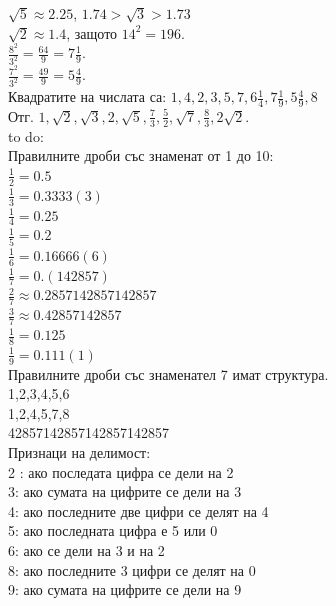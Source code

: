 \documentclass{article}
\begin{document}
$\sqrt{5} \approx 2.25$, $ 1.74 >\sqrt 3 > 1.73 $ \\
$\sqrt 2 \approx 1.4 $, защото $14^2 = 196 $. \\
$\frac{8^2}{3^2} = \frac{64}{9} = 7 \frac{1}{9} $. \\
$\frac{7^2}{3^2} = \frac{49}{9} = 5 \frac{4}{9} $. \\
Квадратите на числата са:
$1,4,2,3,5,7, 6\frac{1}{4}, 7 \frac{1}{9}, 5 \frac{4}{9},8  $ \\
Отг. 
$1, \sqrt 2, \sqrt 3, 2, \sqrt 5, \frac{7}{3}, \frac{5}{2}, \sqrt 7 , \frac{8}{3}, 2\sqrt2 $. \\


\vspace{2cm}
to do: \\
Правилните дроби със знаменат от 1 до 10: \\
$\frac{1}{2} = 0.5  $ \\
$\frac{1}{3} = 0.3333(3) $  \\
$\frac{1}{4} = 0.25  $ \\
$\frac{1}{5} = 0.2  $ \\
$\frac{1}{6} = 0.16666(6) $ \\
$\frac{1}{7} = 0.(142857) $ \\

$\frac{2}{7} \approx 0.2857142857142857 $ \\
$\frac{3}{7} \approx 0.42857142857 $ \\
$\frac{1}{8} = 0.125 $ \\
$\frac{1}{9} = 0.111(1) $ \\

\noindent
Правилните дроби със знаменател 7 имат структура. \\
1,2,3,4,5,6\\
1,2,4,5,7,8 \\
42857142857142857142857 \\
      
 
 Признаци на делимост:\\
 2 : ако последата цифра се дели на 2 \\
  3: ако сумата на цифрите се дели на 3 \\
 4: ако последните две цифри се делят на 4 \\
 5: ако последната цифра е 5 или 0 \\
 6: ако се дели на 3 и на 2 \\
 8: ако последните 3 цифри се делят на 0 \\
 9: ако сумата на цифрите се дели на 9
 \vspace{2cm}
 
\end{document}

